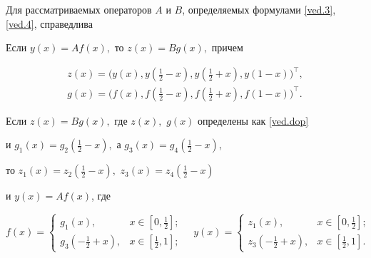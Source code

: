  





 

 

Для рассматриваемых операторов $A$ и $B$, определяемых формулами \eqref{ved.3}, \eqref{ved.4}, справедлива 



\smallskip



\hypertarget{ved:th1}{}



\begin{theorem}[1]

Если  $y(x)=Af(x),$ то $z(x)=Bg(x),$ причем 

$$

\begin{array}{c}

z(x)=\bigl(y(x),y(\frac12-x),y(\frac12+x),y(1-x)\bigr)^{\top},\\[1mm]

g(x)=\bigl(f(x),f(\frac12-x),f(\frac12+x),f(1-x)\bigr)^{\top}.

\end{array}$$ 



Если $z(x)=Bg(x),$ где $z(x),$ $g(x)$ определены как \eqref{ved.dop}

и $g_1(x)=g_2(\frac12-x),$ а $g_3(x)=g_4(\frac12-x)$,

 то $z_1(x)=z_2(\frac12-x),$ $z_3(x)=z_4(\frac12-x)$ 

 и $y(x)=Af(x)$, где  

$$f(x)= 

\left\{

\begin{array}{cl}

g_1(x), &          x\in[0,\frac12];\\[1mm]

g_3(-\frac12+x), & x\in[\frac12,1];

\end{array}

\right. \quad 

y(x)= 

\left\{

\begin{array}{cl}

z_1(x), & x\in[0,\frac12];\\ [1mm] 

z_3(-\frac12+x), & x\in[\frac12,1].

\end{array}

\right.

 $$

\end{theorem}



